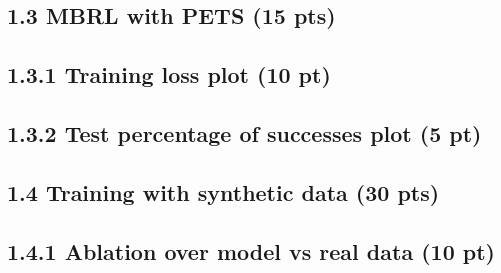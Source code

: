 \documentclass[12pt]{article}
\begin{document}
\begin{tcolorbox}[fit,height=15em, width=40em, blank, borderline={1pt}{1pt},nobeforeafter]
\begin{center}
\end{center}
\end{tcolorbox}


\subsection*{1.3 MBRL with PETS (15 pts)}

\subsection*{1.3.1 Training loss plot (10 pt)}

\begin{tcolorbox}[fit,height=30em, width=40em, blank, borderline={1pt}{1pt},nobeforeafter]
\begin{center}
\end{center}
\end{tcolorbox}

\subsection*{1.3.2 Test percentage of successes plot (5 pt)}

\begin{tcolorbox}[fit,height=30em, width=40em, blank, borderline={1pt}{1pt},nobeforeafter]
\begin{center}
\end{center}
\end{tcolorbox}

\subsection*{1.4 Training with synthetic data (30 pts)}

\subsection*{1.4.1 Ablation over model vs real data (10 pt)}
\begin{tcolorbox}[fit,height=30em, width=40em, blank, borderline={1pt}{1pt},nobeforeafter]
\begin{center}
\end{center}
\end{tcolorbox}
\end{document}
